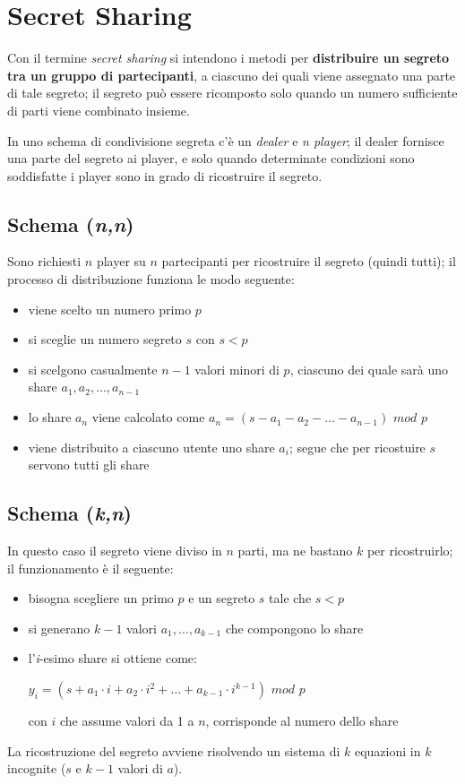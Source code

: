 \chapter{Secret Sharing}

Con il termine \textit{secret sharing} si intendono i metodi per \textbf{distribuire 
un segreto tra un gruppo di partecipanti}, a ciascuno dei quali viene assegnato una 
parte di tale segreto; il segreto può essere ricomposto solo quando un numero 
sufficiente di parti viene combinato insieme.

\noindent In uno schema di condivisione segreta c'è un \textit{dealer} e \textit{n player}; il dealer 
fornisce una parte del segreto ai player, e solo quando determinate condizioni sono soddisfatte 
i player sono in grado di ricostruire il segreto.

\section{Schema (\textit{n,n})}

Sono richiesti $n$ player su $n$ partecipanti per ricostruire il segreto (quindi tutti);
il processo di distribuzione funziona le modo seguente:
\begin{itemize}
    \item viene scelto un numero primo $p$
    \item si sceglie un numero segreto $s$ con $s<p$
    \item si scelgono casualmente $n-1$ valori minori di $p$, ciascuno dei quale sarà uno 
    share $a_1, a_2, \dots, a_{n-1}$
    \item lo share $a_n$ viene calcolato come $a_n = (s- a_1 - a_2 - \dots - a_{n-1})$ $mod$ $p$
    \item viene distribuito a ciascuno utente uno share $a_i$; segue che per ricostuire $s$ servono 
    tutti gli share 
\end{itemize}

\section{Schema (\textit{k,n})}

In questo caso il segreto viene diviso in $n$ parti, ma ne bastano $k$ per ricostruirlo; il 
funzionamento è il seguente:
\begin{itemize}
    \item bisogna scegliere un primo $p$ e un segreto $s$ tale che $s<p$
    \item si generano $k-1$ valori $a_1, \dots, a_{k-1}$ che compongono lo share
    \item l'\textit{i}-esimo share si ottiene come:
    \begin{center}
        $y_i = (s + a_1 \cdot i + a_2 \cdot i^2 + \dots + a_{k-1} \cdot i^{k-1})$ $mod$ $p$
    \end{center}

    con $i$ che assume valori da 1 a $n$, corrisponde al numero dello share
\end{itemize}

\noindent La ricostruzione del segreto avviene risolvendo un sistema di $k$ equazioni in $k$
incognite ($s$ e $k-1$ valori di $a$).

